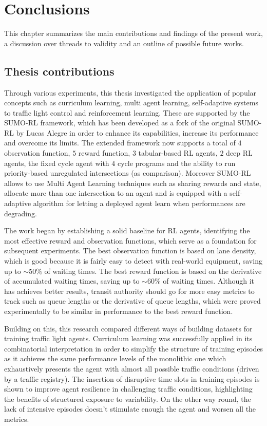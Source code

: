 \chapter{Conclusions}

This chapter summarizes the main contributions and findings of the present work, a discussion over threads to validity and an outline of possible future works.

\section{Thesis contributions}

Through various experiments, this thesis investigated the application of popular concepts such as curriculum learning, multi agent learning, self-adaptive systems to traffic light control and reinforcement learning.
These are supported by the SUMO-RL framework, which has been developed as a fork of the original SUMO-RL by Lucas Alegre in order to enhance its capabilities, increase its performance and overcome its limits.
The extended framework now supports a total of $4$ observation function, $5$ reward function, $3$ tabular-based RL agents, $2$ deep RL agents, the fixed cycle agent with $4$ cycle programs and the ability to run priority-based unregulated intersections (as comparison).
Moreover SUMO-RL allows to use Multi Agent Learning techniques such as sharing rewards and state, allocate more than one intersection to an agent and is equipped with a self-adaptive algorithm for letting a deployed agent learn when performances are degrading.

The work began by establishing a solid baseline for RL agents, identifying the most effective reward and observation functions, which serve as a foundation for subsequent experiments.
The best observation function is based on lane density, which is good because it is fairly easy to detect with real-world equipment, saving up to $\sim 50\%$ of waiting times.
The best reward function is based on the derivative of accumulated waiting times, saving up to $\sim 60\%$ of waiting times.
Although it has achieves better results, transit authority should go for more easy metrics to track such as queue lengths or the derivative of queue lengths, which were proved experimentally to be similar in performance to the best reward function.

Building on this, this research compared different ways of building datasets for training traffic light agents.
Curriculum learning was successfully applied in its combinatorial interpretation in order to simplify the structure of training episodes as it achieves the same performance levels of the monolithic one which exhaustively presents the agent with almost all possible traffic conditions (driven by a traffic registry).
The insertion of disruptive time slots in training episodes is shown to improve agent resilience in challenging traffic conditions, highlighting the benefits of structured exposure to variability.
On the other way round, the lack of intensive episodes doesn't stimulate enough the agent and worsen all the metrics.

